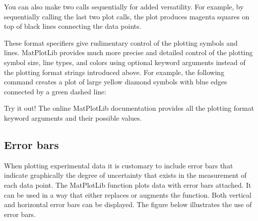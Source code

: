 \documentclass[letterpaper,10pt,english]{sphinxmanual}
\begin{document}
\sphinxAtStartPar
You can also make two calls sequentially for added versatility.  For example, by sequentially calling the last two plot calls, the plot produces magenta squares on top of black lines connecting the data points.

\sphinxAtStartPar
These format specifiers give rudimentary control of the plotting symbols and lines.  MatPlotLib provides much more precise and detailed control of the plotting symbol size, line types, and colors using optional keyword arguments instead of the plotting format strings introduced above.  For example, the following command creates a plot of large yellow diamond symbols with blue edges connected by a green dashed line:

\begin{sphinxVerbatim}[commandchars=\\\{\}]
    
      
\end{sphinxVerbatim}

\sphinxAtStartPar
Try it out!  The online MatPlotLib documentation provides all the plotting format keyword arguments and their possible values.


\subsection{Error bars}
\label{\detokenize{chap5/chap5_plot:error-bars}}
\ignorespaces 
\sphinxAtStartPar
When plotting experimental data it is customary to include error bars that indicate graphically the degree of uncertainty that exists in the measurement of each data point.  The MatPlotLib function  plots data with error bars attached.  It can be used in a way that either replaces or augments the  function.  Both vertical and horizontal error bars can be displayed.  The figure below illustrates the use of error bars.
\end{document}
